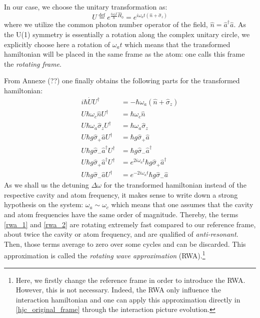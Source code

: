 \documentclass[12pt]{report}
\begin{document}
In our case, we choose the unitary transformation as:
\begin{equation}
\label{unitary_trans_def}
U \stackrel{\text{def}}{=} e^{\frac{i\omega_at}{\hbar}\hat{H}_0} = e^{i\omega_at(\hat{n} + \hat{\sigma}_z)}
\end{equation}
where we utilize the common photon number operator of the field, $\hat{n} = \hat{a}^{\dag}\hat{a}$. As the U(1) symmetry is essentially a rotation along the complex unitary circle, we explicitly choose here a rotation of $\omega_at$ which means that the transformed hamiltonian will be placed in the same frame as the atom: one calls this frame the \textit{rotating frame}.

From Annexe (??) one finally obtains the following parts for the transformed hamiltonian:
\begin{align}
i\hbar \dot{U} U^{\dag} &= -\hbar\omega_a(\hat{n} + \hat{\sigma}_z)\\
U\hbar \omega_c\hat{n} U^{\dag} &= \hbar\omega_c\hat{n}\\
U\hbar \omega_a\hat{\sigma}_z U^{\dag} &= \hbar\omega_a\hat{\sigma}_z\\
U\hbar g\hat{\sigma}_+\hat{a} U^{\dag} &= \hbar g\hat{\sigma}_+\hat{a}\\
U\hbar g\hat{\sigma}_-\hat{a}^{\dag} U^{\dag} &= \hbar g\hat{\sigma}_-\hat{a}^{\dag}\\
\label{rwa_1}
U\hbar g\hat{\sigma}_+\hat{a}^{\dag} U^{\dag} &= e^{2i\omega_at}\hbar g\hat{\sigma}_+\hat{a}^{\dag}\\
\label{rwa_2}
U\hbar g\hat{\sigma}_-\hat{a} U^{\dag} &= e^{-2i\omega_at}\hbar g\hat{\sigma}_-\hat{a}
\end{align}
As we shall us the detuning $\Delta\omega$ for the transformed hamiltonian instead of the respective cavity and atom frequency, it makes sense to write down a strong hypothesis on the system: $\omega_a \sim \omega_c$ which means that one assumes that the cavity and atom frequencies have the same order of magnitude. Thereby, the terms \eqref{rwa_1} and \eqref{rwa_2} are rotating extremely fast compared to our reference frame, about twice the cavity or atom frequency, and are qualified of \textit{anti-resonant}. Then, those terms average to zero over some cycles and can be discarded. This approximation is called the \textit{rotating wave approximation} (RWA).\footnote{Here, we firstly change the reference frame in order to introduce the RWA. However, this is not necessary. Indeed, the RWA only influence the interaction hamiltonian and one can apply this approximation directly in \eqref{hjc_original_frame} through the interaction picture evolution.}
\end{document}
